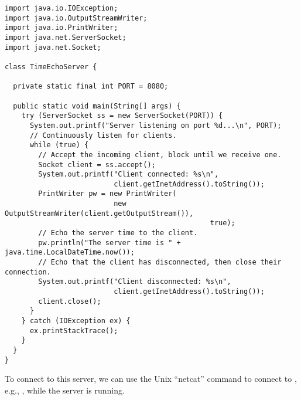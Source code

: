 \begin{lstlisting}[language=MyJava]
import java.io.IOException;
import java.io.OutputStreamWriter;
import java.io.PrintWriter;
import java.net.ServerSocket;
import java.net.Socket;

class TimeEchoServer {

  private static final int PORT = 8080;

  public static void main(String[] args) {
    try (ServerSocket ss = new ServerSocket(PORT)) {
      System.out.printf("Server listening on port %d...\n", PORT);
      // Continuously listen for clients.
      while (true) {
        // Accept the incoming client, block until we receive one.
        Socket client = ss.accept();
        System.out.printf("Client connected: %s\n", 
                          client.getInetAddress().toString());
        PrintWriter pw = new PrintWriter(
                          new OutputStreamWriter(client.getOutputStream()), 
                                                 true);
        // Echo the server time to the client.
        pw.println("The server time is " + java.time.LocalDateTime.now());
        // Echo that the client has disconnected, then close their connection.
        System.out.printf("Client disconnected: %s\n", 
                          client.getInetAddress().toString());
        client.close();
      }
    } catch (IOException ex) { 
      ex.printStackTrace(); 
    }
  }
}
\end{lstlisting}

To connect to this server, we can use the Unix  ``netcat'' command to connect to , e.g., , while the server is running.


